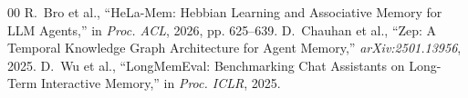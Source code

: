 \documentclass[10pt,conference,twocolumn]{IEEEtran}
\begin{document}
\begin{thebibliography}{00}
 R.~Bro et al., ``HeLa-Mem: Hebbian Learning and Associative Memory for LLM Agents,'' in \textit{Proc. ACL}, 2026, pp. 625--639.
 D.~Chauhan et al., ``Zep: A Temporal Knowledge Graph Architecture for Agent Memory,'' \textit{arXiv:2501.13956}, 2025.
 D.~Wu et al., ``LongMemEval: Benchmarking Chat Assistants on Long-Term Interactive Memory,'' in \textit{Proc. ICLR}, 2025.
\end{thebibliography}
\end{document}

